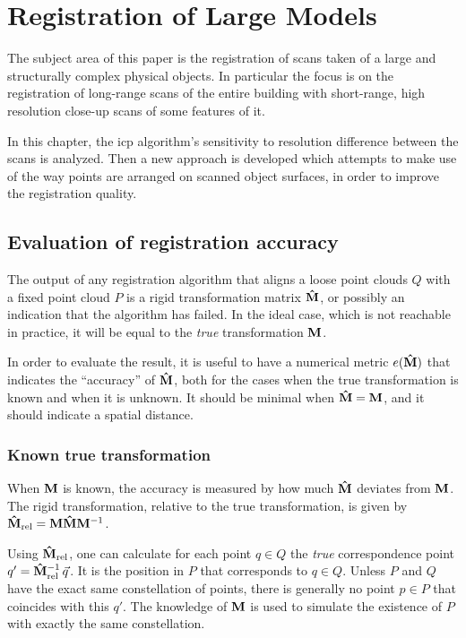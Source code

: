 \chapter{Registration of Large Models} \label{ch:large_model}
The subject area of this paper is the registration of scans taken of a large and structurally complex physical objects. In particular the focus is on the registration of long-range scans of the entire building with short-range, high resolution close-up scans of some features of it.

In this chapter, the \gls{icp} algorithm's sensitivity to resolution difference between the scans is analyzed. Then a new approach is developed which attempts to make use of the way points are arranged on scanned object surfaces, in order to improve the registration quality.

\section{Evaluation of registration accuracy}
The output of any registration algorithm that aligns a loose point clouds $Q$ with a fixed point cloud $P$ is a rigid transformation matrix $\mathbf{\hat{M}}$, or possibly an indication that the algorithm has failed. In the ideal case, which is not reachable in practice, it will be equal to the \emph{true} transformation $\mathbf{M}$.

In order to evaluate the result, it is useful to have a numerical metric $e(\mathbf{\hat{M}})$ that indicates the ``accuracy'' of  $\mathbf{\hat{M}}$, both for the cases when the true transformation is known and when it is unknown. It should be minimal when $\mathbf{\hat{M}} = \mathbf{M}$, and it should indicate a spatial distance.

\subsection{Known true transformation} \label{sec:lm_known_ttrans}
When $\mathbf{M}$ is known, the accuracy is measured by how much $\mathbf{\hat{M}}$ deviates from $\mathbf{M}$. The rigid transformation, relative to the true transformation, is given by $\mathbf{\hat{M}}_{\text{rel}} = \mathbf{M} \mathbf{\hat{M}} \mathbf{M}^{-1}$.

Using $\mathbf{\hat{M}}_{\text{rel}}$, one can calculate for each point $q \in Q$ the \emph{true} correspondence point $q' = \mathbf{\hat{M}}_{\text{rel}}^{-1} \, \vec{q}$. It is the position in $P$ that corresponds to $q \in Q$. Unless $P$ and $Q$ have the exact same constellation of points, there is generally no point $p \in P$ that coincides with this $q'$. The knowledge of $\mathbf{M}$ is used to simulate the existence of $P$ with exactly the same constellation.

